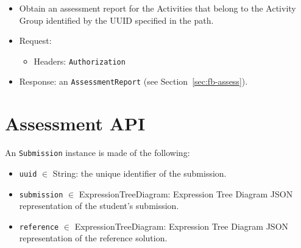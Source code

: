 \begin{chapterBody}
\begin{itemize}
\begin{itemize}
        \item Obtain an assessment report for the Activities that belong to the
Activity Group identified by the UUID specified in the path.
        \item Request:
        \begin{itemize}
            \item Headers: \texttt{Authorization}
        \end{itemize}
        \item Response: an \texttt{AssessmentReport} (see
Section~\ref{sec:fb-assess}).
    \end{itemize}
\end{itemize}

\section{Assessment API}

An \texttt{Submission} instance is made of the following:
\begin{itemize}
    \item \texttt{uuid} $ \in $ String: the unique identifier of the
submission.
    \item \texttt{submission} $ \in $ ExpressionTreeDiagram: Expression
Tree Diagram JSON representation of the student's submission.
    \item \texttt{reference} $ \in $ ExpressionTreeDiagram: Expression
Tree Diagram JSON representation of the reference solution.
\end{itemize}


\end{chapterBody}
